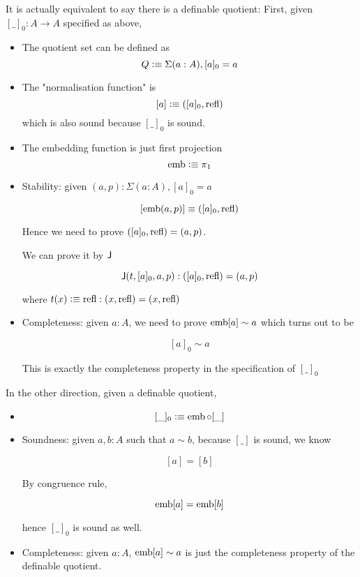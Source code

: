 It is actually equivalent to say there is a definable quotient:
First, given $[\_]_0 : A \to A$ specified as above,

\begin{itemize}
\item The quotient set can be defined as
  $$Q \vcentcolon\equiv \Sigma (a : A), [ a ]_0 = a$$

\item The "normalisation function" is
  $$[a] \vcentcolon\equiv ([a]_0, \operatorname{refl} ) $$
which is also sound because $[\_]_0$ is sound.

\item The embedding function is just first projection
  $$\operatorname{emb} \vcentcolon\equiv \pi_1 $$

\item Stability: given $(a, p) : \Sigma (a : A), [ a ]_0 = a$

$$[\operatorname{emb}(a,p)] \equiv ([a]_0, \operatorname{refl} )$$

Hence we need to prove $([a]_0, \operatorname{refl} ) = (a, p)$.

We can prove it by $\operatorname{\mathsf{J}}$

$$\operatorname{\mathsf{J}}(t,[ a ]_0,a,p) : ([a]_0, \operatorname{refl} ) = (a, p)$$

where $t(x) \vcentcolon\equiv \operatorname{refl} : (x,\operatorname{refl} ) = (x,\operatorname{refl} )$

\item Completeness: given $a : A$, we need to prove $\operatorname{emb}[a] \sim a$ which turns out to be

$$[a]_0 \sim a$$

This is exactly the completeness property in the specification of $[\_]_0$

\end{itemize}

In the other direction, given a definable quotient,

\begin{itemize}

\item $$[\_]_0 \vcentcolon\equiv \operatorname{emb} \circ [\_]$$

\item Soundness: given $a,b : A$ such that $a \sim b$, because $[\_]$ is sound, we know

$$[ a ] = [ b ]$$

By congruence rule,

$$\operatorname{emb}[a] = \operatorname{emb} [ b]$$

hence $[\_]_0$ is sound as well.


\item Completeness: given $a : A$, $\operatorname{emb}[a] \sim a$ is just the completeness property of the definable quotient.

\end{itemize}



